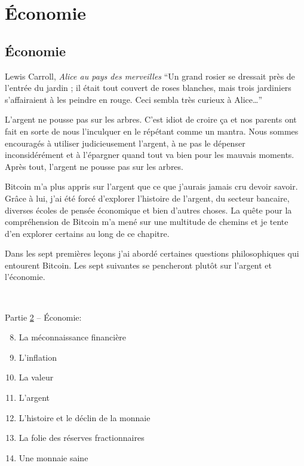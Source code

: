\part{Économie}
\label{ch:economics}
\chapter*{Économie}

\begin{chapquote}{Lewis Carroll, \textit{Alice au pays des merveilles}}
\enquote{Un grand rosier se dressait près de l’entrée du jardin ; il était tout
couvert de roses blanches, mais trois jardiniers s’affairaient à les peindre en
rouge. Ceci sembla très curieux à Alice\ldots}
\end{chapquote}

L'argent ne pousse pas sur les arbres. C'est idiot de croire ça et nos parents
ont fait en sorte de nous l'inculquer en le répétant comme un mantra. Nous
sommes encouragés à utiliser judicieusement l'argent, à ne pas le dépenser
inconsidérément et à l'épargner quand tout va bien pour les mauvais moments.
Après tout, l'argent ne pousse pas sur les arbres.

Bitcoin m'a plus appris sur l'argent que ce que j'aurais jamais cru devoir
savoir. Grâce à lui, j'ai été forcé d'explorer l'histoire de l'argent, du
secteur bancaire, diverses écoles de pensée économique et bien d'autres choses.
La quête pour la compréhension de Bitcoin m'a mené sur une multitude de chemins
et je tente d'en explorer certains au long de ce chapitre.

Dans les sept premières leçons j'ai abordé certaines questions philosophiques
qui entourent Bitcoin. Les sept suivantes se pencheront plutôt sur l'argent et
l'économie.

~

\begin{samepage}
Partie \hyperref[ch:economics]{2} -- Économie:

\begin{enumerate}
  \setcounter{enumi}{7}
  \item La méconnaissance financière
  \item L'inflation
  \item La valeur
  \item L'argent
  \item L'histoire et le déclin de la monnaie
  \item La folie des réserves fractionnaires
  \item Une monnaie saine
\end{enumerate}
\end{samepage}

